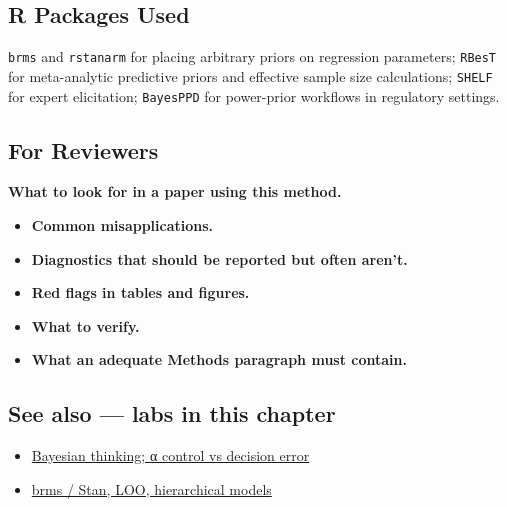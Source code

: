 \documentclass[
]{article}
\providecommand{\tightlist}{%
  \setlength{\itemsep}{0pt}\setlength{\parskip}{0pt}}
\begin{document}
\subsection{R Packages Used}\label{r-packages-used}

\texttt{brms} and \texttt{rstanarm} for placing arbitrary priors on
regression parameters; \texttt{RBesT} for meta-analytic predictive
priors and effective sample size calculations; \texttt{SHELF} for expert
elicitation; \texttt{BayesPPD} for power-prior workflows in regulatory
settings.

\subsection{For Reviewers}\label{for-reviewers}

\textbf{What to look for in a paper using this method.}

\begin{itemize}
\tightlist
\item
  \textbf{Common misapplications.}
\item
  \textbf{Diagnostics that should be reported but often aren't.}
\item
  \textbf{Red flags in tables and figures.}
\item
  \textbf{What to verify.}
\item
  \textbf{What an adequate Methods paragraph must contain.}
\end{itemize}

\subsection{See also --- labs in this
chapter}\label{see-also-labs-in-this-chapter}

\begin{itemize}
\tightlist
\item
  \href{labs/lab-bayesian-thinking-control-vs-decision-error.Rmd}{Bayesian
  thinking; α control vs decision error}
\item
  \href{labs/lab-brms-stan-loo-hierarchical-models.Rmd}{brms / Stan,
  LOO, hierarchical models}
\end{itemize}
\end{document}
